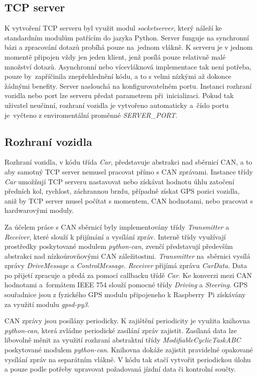 \documentclass[czech, bachelor]{diploma}
\begin{document}
\subsection{TCP server}
K vytvoření TCP serveru byl využit modul \emph{socketserver}, který náleží ke standardním modulům patřícím do jazyka Python.
Server funguje na synchronní bázi a zpracování dotazů probíhá pouze na~jednom vlákně. K serveru je v jednom momentě připojen vždy
jen jeden klient, jenž posílá pouze relativně malé množství dotazů. Asynchronní nebo vícevláknová implementace tak není potřeba,
pouze by~zapříčinila znepřehlednění kódu, a to s velmi nízkými až dokonce žádnými benefity. Server naslouchá na konfigurovatelném
portu. Instanci rozhraní vozidla nebo port lze serveru předat parametrem při~inicializaci. Pokud tak uživatel neučinní, rozhraní
vozidla je vytvořeno automaticky a~číslo portu je~vyčteno z enviromentální proměnné \emph{SERVER\_PORT}.

\subsection{Rozhraní vozidla}
Rozhraní vozidla, v kódu třída \emph{Car}, představuje abstrakci nad sběrnicí CAN, a to aby samotný TCP server nemusel pracovat
přímo s CAN zprávami. Instance třídy \emph{Car} umožňují TCP serveru nastavovat nebo získávat hodnotu úhlu zatočení předních kol,
rychlost, záchrannou brzdu, případně získat GPS pozici vozidla, aniž by TCP server musel počítat s momentem, CAN hodnotami, nebo
pracovat s hardwarovými moduly.

Za účelem práce s CAN sběrnicí byly implementovány třídy \emph{Transmitter} a \emph{Receiver}, které slouží k přijímání a vysílání
zpráv. Interně třídy využívají prostředky poskytované modulem \emph{python-can}, zvenčí představují především abstrakci
nad nízkoúrovňovými CAN záležitostmi. \emph{Transmitter} na~sběrnici vysílá zprávy \emph{DriveMessage} a \emph{ControlMessage}.
\emph{Receiver} přijímá zprávu \emph{CarData}. Data po přijetí zpracuje a předá za pomocí callbacku třídě \emph{Car}. Ke konverzi
mezi CAN hodnotami a~formátem IEEE 754 slouží pomocné třídy \emph{Driving} a \emph{Steering}. GPS souřadnice jsou z fyzického GPS
modulu připojeneho k Raspberry~Pi získávány za využití modulu \emph{gpsd-py3}.

CAN zprávy jsou posílány periodicky. K zajištění periodicity je využita knihovna \emph{python-can}, která zvládne periodické
zasílání zpráv zajistit. Zasílaná data lze libovolně měnit za využití rozhraní abstraktní třídy \emph{ModifiableCyclicTaskABC}
poskytované modulem \emph{python-can}. Knihovna dokáže zajistit pravidelné opakované vysílání zpráv na separátním vlákně. V kódu
tak stačí vytvořit periodickou úlohu a pouze podle potřeby upravovat požadovaná jízdní data či kontrolní součty.
\end{document}
